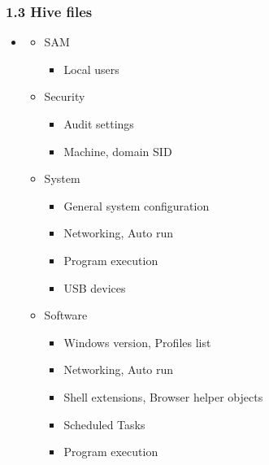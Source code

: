 \begin{frame}[fragile]
  \frametitle{1.3 Hive files}
   \begin{itemize}
       \item[]
   \begin{itemize}
      \item SAM
      \begin{itemize}
          \item Local users
      \end{itemize}
      \item Security
      \begin{itemize}
          \item Audit settings
          \item Machine, domain SID
      \end{itemize}
      \item System
      \begin{itemize}
          \item General system configuration
          \item Networking, Auto run
          \item Program execution
          \item USB devices
       \end{itemize}
      \item Software
      \begin{itemize}
          \item Windows version, Profiles list
          \item Networking, Auto run
          \item Shell extensions, Browser helper objects
          \item Scheduled Tasks
          \item Program execution
      \end{itemize}
   \end{itemize}
   \end{itemize}
\end{frame}


